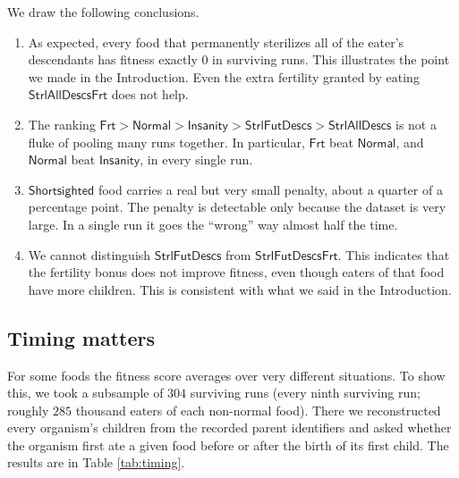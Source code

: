 \documentclass{article}
\begin{document}
We draw the following conclusions.
\begin{enumerate}
    \item As expected, every food that permanently sterilizes all of the
    eater's descendants
        has fitness exactly $0$ in surviving runs. This
        illustrates the point we made in the Introduction. Even the extra
        fertility granted by eating
        $\mathsf{StrlAllDescsFrt}$ does not help.
    \item The ranking $\mathsf{Frt} > \mathsf{Normal} > \mathsf{Insanity} >
        \mathsf{StrlFutDescs} > \mathsf{StrlAllDescs}$ is not a fluke of
        pooling many runs together. In particular, $\mathsf{Frt}$ beat
        $\mathsf{Normal}$, and $\mathsf{Normal}$ beat $\mathsf{Insanity}$,
        in every single run.
    \item $\mathsf{Shortsighted}$ food carries a real but very small penalty,
        about a quarter of a percentage point. The penalty is detectable only
        because the dataset is very large. In a single run it goes the
        ``wrong'' way almost half the time.
    \item We cannot distinguish $\mathsf{StrlFutDescs}$ from
        $\mathsf{StrlFutDescsFrt}$. This indicates that the fertility bonus
        does not improve fitness, even though eaters of that food have more
        children. This is consistent with what we said in the Introduction.
\end{enumerate}



\subsection{Timing matters}
\label{sec:timing}

For some foods the fitness score averages over very different situations. To
show this, we took a subsample of $304$ surviving runs (every ninth surviving
run; roughly $285$ thousand eaters of each non-normal food). There we
reconstructed every organism's children from the recorded parent identifiers
and asked whether the organism first ate a given food before or after the
birth of its first child. The results are in Table \ref{tab:timing}.
\end{document}
